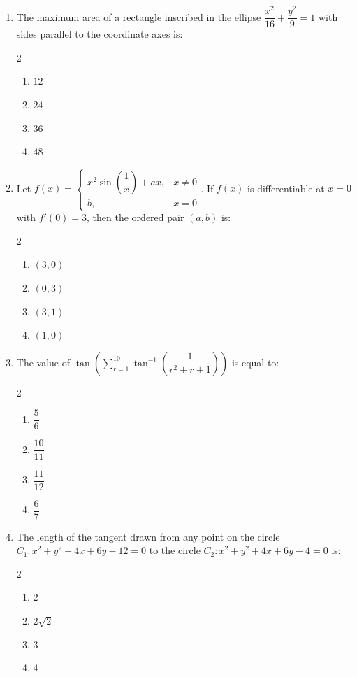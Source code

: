 \documentclass[11pt,a4paper]{article}
\begin{document}
\begin{enumerate}[label=\textbf{\arabic*.},leftmargin=18pt,itemsep=12pt]
  \item The maximum area of a rectangle inscribed in the ellipse $\dfrac{x^2}{16} + \dfrac{y^2}{9} = 1$ with sides parallel to the coordinate axes is:
  \begin{multicols}{2}
    \begin{enumerate}[label=(\Alph*)]
      \item $12$
      \item $24$
      \item $36$
      \item $48$
    \end{enumerate}
  \end{multicols}

  \item Let $f(x) = \begin{cases} x^2 \sin\left(\dfrac{1}{x}\right) + ax, & x \ne 0 \\ b, & x = 0 \end{cases}$. If $f(x)$ is differentiable at $x = 0$ with $f'(0) = 3$, then the ordered pair $(a, b)$ is:
  \begin{multicols}{2}
    \begin{enumerate}[label=(\Alph*)]
      \item $(3, 0)$
      \item $(0, 3)$
      \item $(3, 1)$
      \item $(1, 0)$
    \end{enumerate}
  \end{multicols}

  \item The value of $\tan\left( \displaystyle\sum_{r=1}^{10} \tan^{-1}\left(\dfrac{1}{r^2 + r + 1}\right) \right)$ is equal to:
  \begin{multicols}{2}
    \begin{enumerate}[label=(\Alph*)]
      \item $\dfrac{5}{6}$
      \item $\dfrac{10}{11}$
      \item $\dfrac{11}{12}$
      \item $\dfrac{6}{7}$
    \end{enumerate}
  \end{multicols}

  \item The length of the tangent drawn from any point on the circle $C_1: x^2 + y^2 + 4x + 6y - 12 = 0$ to the circle $C_2: x^2 + y^2 + 4x + 6y - 4 = 0$ is:
  \begin{multicols}{2}
    \begin{enumerate}[label=(\Alph*)]
      \item $2$
      \item $2\sqrt{2}$
      \item $3$
      \item $4$
    \end{enumerate}
  \end{multicols}


\end{enumerate}
\end{document}
